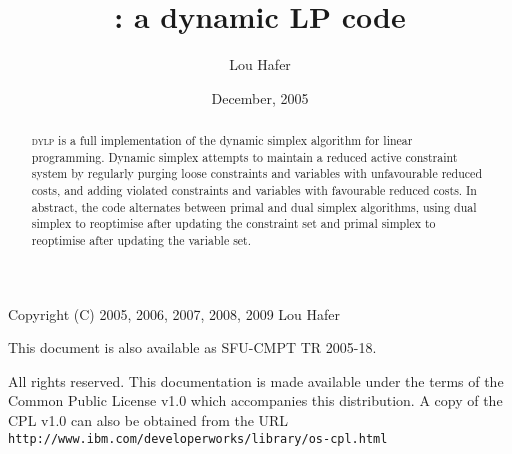 \documentclass[titlepage]{article}
\title{\bfseries \dylp: a dynamic LP code}
\author{Lou Hafer}
\date{December, 2005}
\newcommand{\dylp}{\textsc{dylp}\xspace}
\begin{document}
\maketitle

\thispagestyle{empty}
\vspace*{\fill}

\noindent
Copyright (C) 2005, 2006, 2007, 2008, 2009 Lou Hafer

\noindent
This document is also available as SFU-CMPT TR 2005-18.

\noindent
All rights reserved. This documentation is made available under the terms of
the Common Public License v1.0 which accompanies this distribution.
A copy of the CPL v1.0 can also be obtained from the URL
\texttt{http://www.ibm.com/developerworks/library/os-cpl.html}

\begin{abstract}\noindent
\dylp is a full implementation of the dynamic simplex algorithm for
linear programming.
Dynamic simplex attempts to maintain a reduced active constraint system
by regularly
purging loose constraints and variables with unfavourable reduced costs, and
adding violated constraints and variables with favourable reduced costs.
In abstract, the code alternates between primal and dual simplex algorithms,
using dual simplex to reoptimise after updating the constraint set and primal
simplex to reoptimise after updating the variable set.
\end{abstract}






















\end{document}
